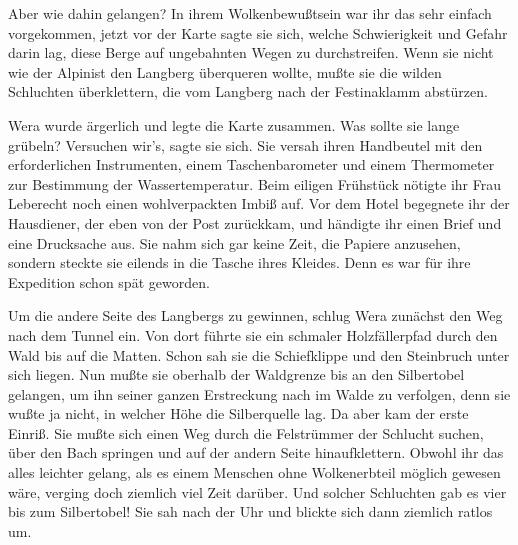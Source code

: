Aber wie dahin gelangen? In ihrem Wolkenbewußtsein war ihr das sehr
einfach vorgekommen, jetzt vor der Karte sagte sie sich, welche
Schwierigkeit und Gefahr darin lag, diese Berge auf ungebahnten
Wegen zu durchstreifen. Wenn sie nicht wie der Alpinist den
Langberg überqueren wollte, mußte sie die wilden Schluchten
überklettern, die vom Langberg nach der Festinaklamm abstürzen.

Wera wurde ärgerlich und legte die Karte zusammen. Was sollte sie
lange grübeln? Versuchen wir's, sagte sie sich. Sie versah ihren
Handbeutel mit den erforderlichen Instrumenten, einem
Taschenbarometer und einem Thermometer zur Bestimmung der
Wassertemperatur. Beim eiligen Frühstück nötigte ihr Frau Leberecht
noch einen wohlverpackten Imbiß auf. Vor dem Hotel begegnete ihr
der Hausdiener, der eben von der Post zurückkam, und händigte ihr
einen Brief und eine Drucksache aus. Sie nahm sich gar keine Zeit,
die Papiere anzusehen, sondern steckte sie eilends in die Tasche
ihres Kleides. Denn es war für ihre Expedition schon spät
geworden.

Um die andere Seite des Langbergs zu gewinnen, schlug Wera zunächst
den Weg nach dem Tunnel ein. Von dort führte sie ein schmaler
Holzfällerpfad durch den Wald bis auf die Matten. Schon sah sie die
Schiefklippe und den Steinbruch unter sich liegen. Nun mußte sie
oberhalb der Waldgrenze bis an den Silbertobel gelangen, um ihn
seiner ganzen Erstreckung nach im Walde zu verfolgen, denn sie
wußte ja nicht, in welcher Höhe die Silberquelle lag. Da aber kam
der erste Einriß. Sie mußte sich einen Weg durch die Felstrümmer
der Schlucht suchen, über den Bach springen und auf der andern
Seite hinaufklettern. Obwohl ihr das alles leichter gelang, als es
einem Menschen ohne Wolkenerbteil möglich gewesen wäre, verging
doch ziemlich viel Zeit darüber. Und solcher Schluchten gab es vier
bis zum Silbertobel! Sie sah nach der Uhr und blickte sich dann
ziemlich ratlos um.

